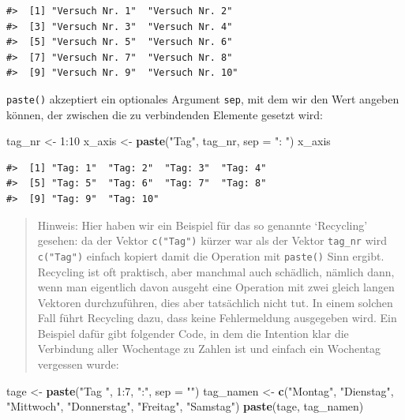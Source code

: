 \documentclass[]{tufte-book}
\newenvironment{Shaded}{}{}
\newcommand{\KeywordTok}[1]{\textcolor[rgb]{0.00,0.44,0.13}{\textbf{#1}}}
\newcommand{\DataTypeTok}[1]{\textcolor[rgb]{0.56,0.13,0.00}{#1}}
\newcommand{\DecValTok}[1]{\textcolor[rgb]{0.25,0.63,0.44}{#1}}
\newcommand{\StringTok}[1]{\textcolor[rgb]{0.25,0.44,0.63}{#1}}
\newcommand{\OperatorTok}[1]{\textcolor[rgb]{0.40,0.40,0.40}{#1}}
\newcommand{\NormalTok}[1]{#1}
\begin{document}
\begin{verbatim}
#>  [1] "Versuch Nr. 1"  "Versuch Nr. 2" 
#>  [3] "Versuch Nr. 3"  "Versuch Nr. 4" 
#>  [5] "Versuch Nr. 5"  "Versuch Nr. 6" 
#>  [7] "Versuch Nr. 7"  "Versuch Nr. 8" 
#>  [9] "Versuch Nr. 9"  "Versuch Nr. 10"
\end{verbatim}

\texttt{paste()} akzeptiert ein optionales Argument \texttt{sep}, mit
dem wir den Wert angeben können, der zwischen die zu verbindenden
Elemente gesetzt wird:

\begin{Shaded}
\begin{Highlighting}[]
\NormalTok{tag_nr <-}\StringTok{ }\DecValTok{1}\OperatorTok{:}\DecValTok{10}
\NormalTok{x_axis <-}\StringTok{ }\KeywordTok{paste}\NormalTok{(}\StringTok{"Tag"}\NormalTok{, tag_nr, }\DataTypeTok{sep =} \StringTok{": "}\NormalTok{)}
\NormalTok{x_axis}
\end{Highlighting}
\end{Shaded}

\begin{verbatim}
#>  [1] "Tag: 1"  "Tag: 2"  "Tag: 3"  "Tag: 4" 
#>  [5] "Tag: 5"  "Tag: 6"  "Tag: 7"  "Tag: 8" 
#>  [9] "Tag: 9"  "Tag: 10"
\end{verbatim}

\begin{quote}
Hinweis: Hier haben wir ein Beispiel für das so genannte `Recycling'
gesehen: da der Vektor \texttt{c("Tag")} kürzer war als der Vektor
\texttt{tag\_nr} wird \texttt{c("Tag")} einfach kopiert damit die
Operation mit \texttt{paste()} Sinn ergibt. Recycling ist oft praktisch,
aber manchmal auch schädlich, nämlich dann, wenn man eigentlich davon
ausgeht eine Operation mit zwei gleich langen Vektoren durchzuführen,
dies aber tatsächlich nicht tut. In einem solchen Fall führt Recycling
dazu, dass keine Fehlermeldung ausgegeben wird. Ein Beispiel dafür gibt
folgender Code, in dem die Intention klar die Verbindung aller
Wochentage zu Zahlen ist und einfach ein Wochentag vergessen wurde:
\end{quote}

\begin{Shaded}
\begin{Highlighting}[]
\NormalTok{tage <-}\StringTok{ }\KeywordTok{paste}\NormalTok{(}\StringTok{"Tag "}\NormalTok{, }\DecValTok{1}\OperatorTok{:}\DecValTok{7}\NormalTok{, }\StringTok{":"}\NormalTok{, }\DataTypeTok{sep =} \StringTok{""}\NormalTok{)}
\NormalTok{tag_namen <-}\StringTok{ }\KeywordTok{c}\NormalTok{(}\StringTok{"Montag"}\NormalTok{, }\StringTok{"Dienstag"}\NormalTok{, }\StringTok{"Mittwoch"}\NormalTok{, }
    \StringTok{"Donnerstag"}\NormalTok{, }\StringTok{"Freitag"}\NormalTok{, }\StringTok{"Samstag"}\NormalTok{)}
\KeywordTok{paste}\NormalTok{(tage, tag_namen)}
\end{Highlighting}
\end{Shaded}
\end{document}
